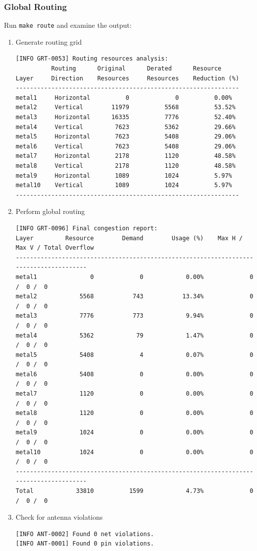 \documentclass[a4paper,12pt,twoside]{article}
\begin{document}
\subsubsection{Global Routing}
Run \texttt{make route} and examine the output:
\begin{enumerate}
    \item Generate routing grid
    \begin{verbatim}
[INFO GRT-0053] Routing resources analysis:
          Routing      Original      Derated      Resource
Layer     Direction    Resources     Resources    Reduction (%)
---------------------------------------------------------------
metal1     Horizontal          0             0          0.00%
metal2     Vertical        11979          5568          53.52%
metal3     Horizontal      16335          7776          52.40%
metal4     Vertical         7623          5362          29.66%
metal5     Horizontal       7623          5408          29.06%
metal6     Vertical         7623          5408          29.06%
metal7     Horizontal       2178          1120          48.58%
metal8     Vertical         2178          1120          48.58%
metal9     Horizontal       1089          1024          5.97%
metal10    Vertical         1089          1024          5.97%
---------------------------------------------------------------
    \end{verbatim}
    \item Perform global routing
    \begin{verbatim}
[INFO GRT-0096] Final congestion report:
Layer         Resource        Demand        Usage (%)    Max H / Max V / Total Overflow
---------------------------------------------------------------------------------------
metal1               0             0            0.00%             0 /  0 /  0
metal2            5568           743           13.34%             0 /  0 /  0
metal3            7776           773            9.94%             0 /  0 /  0
metal4            5362            79            1.47%             0 /  0 /  0
metal5            5408             4            0.07%             0 /  0 /  0
metal6            5408             0            0.00%             0 /  0 /  0
metal7            1120             0            0.00%             0 /  0 /  0
metal8            1120             0            0.00%             0 /  0 /  0
metal9            1024             0            0.00%             0 /  0 /  0
metal10           1024             0            0.00%             0 /  0 /  0
---------------------------------------------------------------------------------------
Total            33810          1599            4.73%             0 /  0 /  0
    \end{verbatim}
    \item Check for antenna violations
    \begin{verbatim}
[INFO ANT-0002] Found 0 net violations.
[INFO ANT-0001] Found 0 pin violations.
    \end{verbatim}
\end{enumerate}
\end{document}
